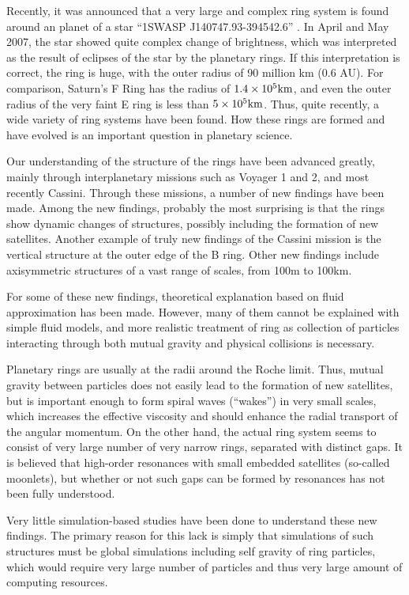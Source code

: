 \documentclass[oribibl]{llncs}
\begin{document}
Recently, it was announced that a very large and complex ring system
is found around an planet of a star ``1SWASP J140747.93-394542.6''
\cite{2012AJ....143...72M, 2014MNRAS.441.2845V, 2015MNRAS.446..411K,
  2015ApJ...800..126K}. In April and May 2007, the star showed quite
complex change of brightness, which was interpreted as the result of
eclipses of the star by the planetary rings. If this interpretation is
correct, the ring is huge, with the outer radius of 90 million km (0.6
AU). For comparison, Saturn's F Ring has the radius of $1.4\times
10^5{\rm km}$, and even the outer radius of the very faint E ring is
less than $5\times 10^5{\rm km}$.  Thus, quite recently, a wide
variety of ring systems have been found.  How these rings are formed
and have evolved is an important question in planetary science.

Our understanding of the structure of the rings have been advanced
greatly, mainly through interplanetary missions such as Voyager 1 and
2, and most recently Cassini. Through these missions, a number of new
findings have been made. Among the new findings, probably the most
surprising is that the rings show dynamic changes of structures,
possibly including the formation of new satellites. Another example of
truly new findings of the Cassini mission is the vertical structure at
the outer edge of the B ring.  Other new findings include axisymmetric
structures of a vast range of scales, from 100m to 100km.

For some of these new findings, theoretical explanation based on fluid
approximation has been made. However, many of them cannot be explained
with simple fluid models, and more realistic treatment of ring as
collection of particles interacting through both mutual gravity and
physical collisions is necessary.

Planetary rings are usually at the radii around the Roche limit. Thus,
mutual gravity between particles does not easily lead to the formation
of new satellites, but is important enough to form spiral waves
(``wakes'') in very small scales, which increases the effective
viscosity and should enhance the radial transport of the angular
momentum. On the other hand, the actual ring system seems to consist
of very large number of very narrow rings, separated with distinct
gaps. It is believed that high-order resonances with small embedded
satellites (so-called moonlets), but whether or not such gaps can be
formed by resonances has not been fully understood.

Very little simulation-based studies have been done to understand
these new findings. The primary reason for this lack is simply that
simulations of such structures must be global simulations including
self gravity of ring particles, which would require very large number
of particles and thus very large amount of computing resources.
\end{document}

